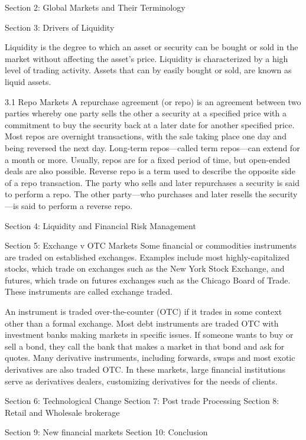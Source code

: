 Section 2: Global Markets and Their Terminology

Section 3: Drivers of Liquidity

Liquidity is the degree to which an asset or security can be bought or sold in the market without affecting the asset's price. Liquidity is characterized by a high level of trading activity. Assets that can by easily bought or sold, are known as liquid assets.

3.1 Repo Markets
A repurchase agreement (or repo) is an agreement between two parties whereby one party sells the other a security at a specified price with a commitment to buy the security back at a later date for another specified price. Most repos are overnight transactions, with the sale taking place one day and being reversed the next day. Long-term repos—called term repos—can extend for a month or more. Usually, repos are for a fixed period of time, but open-ended deals are also possible. Reverse repo is a term used to describe the opposite side of a repo transaction. The party who sells and later repurchases a security is said to perform a repo. The other party—who purchases and later resells the security—is said to perform a reverse repo.

Section 4: Liquidity and Financial Risk Management

Section 5: Exchange v OTC Markets
Some financial or commodities instruments are traded on established exchanges. Examples include most highly-capitalized stocks, which trade on exchanges such as the New York Stock Exchange, and futures, which trade on futures exchanges such as the Chicago Board of Trade. These instruments are called exchange traded.

An instrument is traded over-the-counter (OTC) if it trades in some context other than a formal exchange. Most debt instruments are traded OTC with investment banks making markets in specific issues. If someone wants to buy or sell a bond, they call the bank that makes a market in that bond and ask for quotes. Many derivative instruments, including forwards, swaps and most exotic derivatives are also traded OTC. In these markets, large financial institutions serve as derivatives dealers, customizing derivatives for the needs of clients.

Section 6: Technological Change
Section 7: Post trade Processing
Section 8: Retail and Wholesale brokerage

Section 9: New financial markets
Section 10: Conclusion



